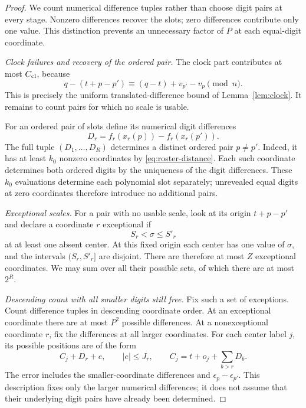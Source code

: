 \begin{proof}
We count numerical difference tuples rather than choose digit pairs at
every stage. Nonzero differences recover the slots; zero differences
contribute only one value. This distinction prevents an unnecessary factor
of $P$ at each equal-digit coordinate.

\emph{Clock failures and recovery of the ordered pair.}
The clock part contributes at most $C_{\rm cl}$, because
\[
      q-(t+p-p')\equiv(q-t)+v_{p'}-v_p\pmod n.
\]
This is precisely the uniform translated-difference bound of
Lemma~\ref{lem:clock}.  It remains to count pairs for which no scale
is usable.

For an ordered pair of slots define its numerical digit differences
\[
                  D_r=f_r(x_r(p))-f_r(x_r(p')).
\]
The full tuple $(D_1,\ldots,D_R)$ determines a distinct ordered pair
$p\neq p'$.  Indeed, it has at least $k_0$ nonzero coordinates by
\eqref{eq:roster-distance}.  Each such coordinate determines both
ordered digits by the uniqueness of the digit differences.  These
$k_0$ evaluations determine each polynomial slot separately; unrevealed
equal digits at zero coordinates therefore introduce no additional pairs.

\emph{Exceptional scales.}
For a pair with no usable scale, look at its origin $t+p-p'$ and
declare a coordinate $r$ exceptional if
\begin{equation}\label{eq:exceptional-scale}
                S_r<\sigma\leq S'_r
\end{equation}
at at least one absent center.  At this fixed origin each center has
one value of $\sigma$, and the intervals $(S_r,S'_r]$ are disjoint.
There are therefore at most $Z$ exceptional coordinates.  We may sum
over all their possible sets, of which there are at most $2^R$.

\emph{Descending count with all smaller digits still free.}
Fix such a set of exceptions.  Count difference tuples in descending
coordinate order.  At an exceptional coordinate there are at most
$P^2$ possible differences.  At a nonexceptional coordinate $r$, fix
the differences at all larger coordinates.  For each center label
$j$, its possible positions are of the form
\begin{equation}\label{eq:center-digit-error}
 C_j+D_r+e,\qquad |e|\leq J_r,\qquad
 C_j=t+o_j+\sum_{b>r}D_b.
\end{equation}
The error includes the smaller-coordinate differences and
$\epsilon_p-\epsilon_{p'}$.  This description fixes only the larger
numerical differences; it does not assume that their underlying
digit pairs have already been determined.


\end{proof}
